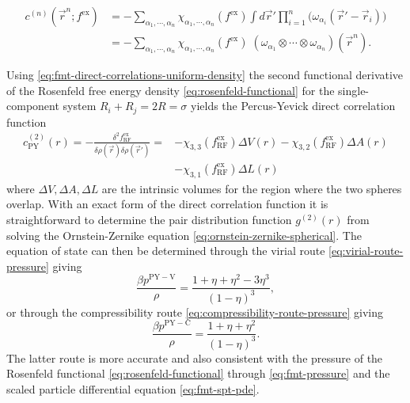 \begin{equation}\label{eq:fmt-direct-correlations-uniform-density}
  \begin{split}
    c^{(n)}(\vec{r}^n; f^\mathrm{ex})
    &=
    - \sum_{\alpha_1, \cdots, \alpha_n}
    \chi_{\alpha_1, \cdots, \alpha_n}(f^\mathrm{ex})
    \int d\vec{r}'
    \prod_{i=1}^n \Big( \omega_{\alpha_i}(\vec{r}' - \vec{r}_i) \Big)
    \\ &=
    - \sum_{\alpha_1, \cdots, \alpha_n}
    \chi_{\alpha_1, \cdots, \alpha_n}(f^\mathrm{ex}) \;
    (\omega_{\alpha_1} \otimes \cdots \otimes \omega_{\alpha_n})
    (\vec{r}^n).
  \end{split}
\end{equation}

\begin{tcolorbox}[title=Percus-Yevick theory in hard spheres]
  Using \eqref{eq:fmt-direct-correlations-uniform-density} the second functional derivative of the Rosenfeld free energy density \eqref{eq:rosenfeld-functional} for the single-component system $R_i + R_j = 2R = \sigma$ yields the Percus-Yevick direct correlation function \cite{RosenfeldJCP1988,WertheimPRL1963}
  \begin{align}
    c^{(2)}_\mathrm{PY}(r)
    =
    - \frac{\delta^2 f_\mathrm{RF}^\mathrm{ex}}{\delta \rho(\vec{r}) \delta \rho(\vec{r}')}
    =&
    - \chi_{3,3}(f_\mathrm{RF}^\mathrm{ex}) \Delta V(r)
    - \chi_{3,2}(f_\mathrm{RF}^\mathrm{ex}) \Delta A(r)
    \nonumber \\ &
    - \chi_{3,1}(f_\mathrm{RF}^\mathrm{ex}) \Delta L(r)
  \end{align}
  where $\Delta V, \Delta A, \Delta L$ are the intrinsic volumes for the region where the two spheres overlap.
  With an exact form of the direct correlation function it is straightforward to determine the pair distribution function $g^{(2)}(r)$ from solving the Ornstein-Zernike equation \eqref{eq:ornstein-zernike-spherical}.
  The equation of state can then be determined through the virial route \eqref{eq:virial-route-pressure} giving
  \begin{equation}
    \frac{\beta p^\mathrm{PY-V}}{\rho}
    =
    \frac{1 + \eta + \eta^2 - 3\eta^3}{(1 - \eta)^3},
  \end{equation}
  or through the compressibility route \eqref{eq:compressibility-route-pressure} giving
  \begin{equation}\label{eq:pyc-pressure}
    \frac{\beta p^\mathrm{PY-C}}{\rho}
    =
    \frac{1 + \eta + \eta^2}{(1 - \eta)^3}.
  \end{equation}
  The latter route is more accurate and also consistent with the pressure of the Rosenfeld functional \eqref{eq:rosenfeld-functional} through \eqref{eq:fmt-pressure} and the scaled particle differential equation%
  \eqref{eq:fmt-spt-pde}.
\end{tcolorbox}

